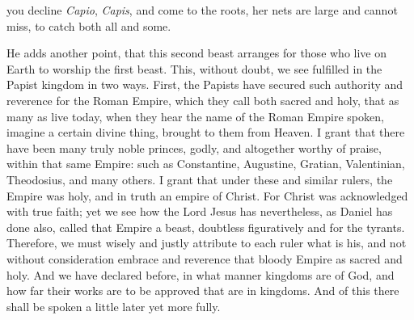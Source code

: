 you decline \textit{Capio}, \textit{Capis}, and come to the roots, her nets are large and cannot miss, to catch both all and some.

He adds another point, that this second beast arranges for those who live on Earth to worship the first beast. This, without doubt, we see fulfilled in the Papist kingdom in two ways. First, the Papists have secured such authority and reverence for the Roman Empire, which they call both sacred and holy, that as many as live today, when they hear the name of the Roman Empire spoken, imagine a certain divine thing, brought to them from Heaven. I grant that there have been many truly noble princes, godly, and altogether worthy of praise, within that same Empire: such as Constantine, Augustine, Gratian, Valentinian, Theodosius, and many others. I grant that under these and similar rulers, the Empire was holy, and in truth an empire of Christ. For Christ was acknowledged with true faith; yet we see how the Lord Jesus has nevertheless, as Daniel has done also, called that Empire a beast, doubtless figuratively and for the tyrants. Therefore, we must wisely and justly attribute to each ruler what is his, and not without consideration embrace and reverence that bloody Empire as sacred and holy. And we have declared before, in what manner kingdoms are of God, and how far their works are to be approved that are in kingdoms. And of this there shall be spoken a little later yet more fully.

